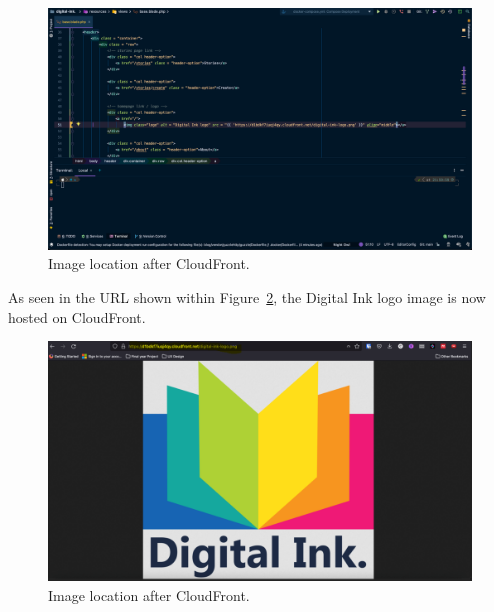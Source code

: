 \clearpage
\begin{figure}[!htbp]
    \centering
    \includegraphics[width=\textwidth]{resources/cloudfront/cloudfront-after}
    \caption{Image location after CloudFront.}
    \label{fig:cloudfront-after}
\end{figure}

As seen in the URL shown within Figure~\ref{fig:cloudfront-website}, the Digital Ink logo image is now hosted on
CloudFront.

\begin{figure}[!htbp]
    \centering
    \includegraphics[width=\textwidth]{resources/cloudfront/cloudfront-website}
    \caption{Image location after CloudFront.}
    \label{fig:cloudfront-website}
\end{figure}
